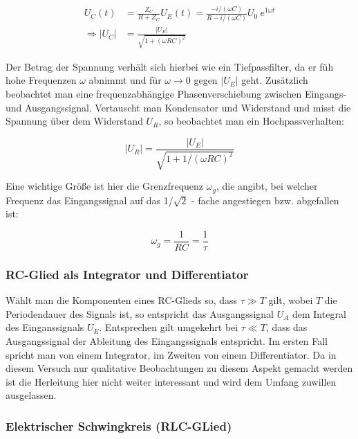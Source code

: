 \documentclass{article}
\begin{document}
\begin{equation}
    \begin{split}
        U_C(t) &= \frac{Z_C}{R + Z_C} U_E(t) = \frac{- i /(\omega C)}{ R - i /(\omega C)} U_0 \ e^{1 \omega t} \\ 
        \Rightarrow |U_C| &= \frac{|U_E|}{\sqrt{1+ (\omega R C)^2}}
    \end{split}
\end{equation}

Der Betrag der Spannung verhält sich hierbei wie ein Tiefpassfilter, da er füh hohe Frequenzen $\omega$ abnimmt und für $\omega \xrightarrow{} 0$ gegen $|U_E|$ geht. Zusätzlich beobachtet man eine frequenzabhängige Phasenverschiebung zwischen Eingangs- und Ausgangssignal. Vertauscht man Kondensator und Widerstand und misst die Spannung über dem Widerstand $U_R$, so beobachtet man ein Hochpassverhalten:

\begin{equation}
    |U_R| = \frac{|U_E|}{\sqrt{1+ 1/(\omega R C)^2}}
\end{equation}

Eine wichtige Größe ist hier die Grenzfrequenz $\omega_g$, die angibt, bei welcher Frequenz das Eingangssignal auf das 1/$\sqrt{2}$ - fache angestiegen bzw. abgefallen ist:

\begin{equation}
    \omega_g = \frac{1}{RC} = \frac{1}{\tau}
\end{equation}

\subsubsection{RC-Glied als Integrator und Differentiator}

Wählt man die Komponenten eines RC-Glieds so, dass $\tau \gg T$ gilt, wobei $T$ die Periodendauer des Signals ist, so entspricht das Ausgangssignal $U_A$ dem Integral des Einganssignals $U_E$. Entsprechen gilt umgekehrt bei $\tau \ll T$, dass das Ausgangssignal der Ableitung des Eingangssignals entspricht. Im ersten Fall spricht man von einem Integrator, im Zweiten von einem Differentiator. Da in diesem Versuch nur qualitative Beobachtungen zu diesem Aspekt gemacht werden ist die Herleitung hier nicht weiter interessant und wird dem Umfang zuwillen ausgelassen.

\subsubsection{Elektrischer Schwingkreis (RLC-GLied)}
\end{document}
